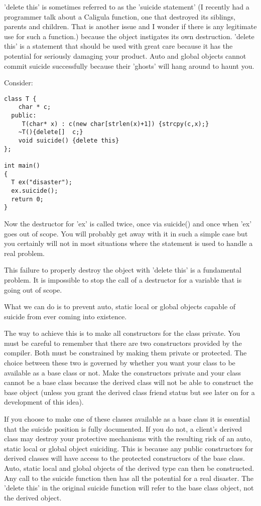 \documentclass{book}
\begin{document}
'delete this' is sometimes referred to as the 'suicide statement' (I recently had a programmer talk about a Caligula function, one that destroyed its siblings, parents and children.
That is another issue and I wonder if there is any legitimate use for such a function.) because the object instigates its own destruction. 
'delete this' is a statement that should be used with great care because it has the potential for seriously damaging your product. 
Auto and global objects cannot commit suicide successfully because their 'ghosts' will hang around to haunt you.

Consider:
\begin{lstlisting}
class T {
    char * c; 
  public:
     T(char* x) : c(new char[strlen(x)+1]) {strcpy(c,x);}
    ~T(){delete[]  c;}
    void suicide() {delete this}
};

int main()
{
  T ex("disaster"); 
  ex.suicide(); 
  return 0;
}
\end{lstlisting}

Now the destructor for 'ex' is called twice, once via suicide() and once when 'ex' goes out of scope.
You will probably get away with it in such a simple case but you certainly will not in most situations where the statement is used to handle a real problem.

This failure to properly destroy the object with 'delete this' is a fundamental problem. It is impossible to stop the call of a destructor for a variable that is going out of scope.

What we can do is to prevent auto, static local or global objects capable of suicide from ever coming into existence.

The way to achieve this is to make all constructors for the class private. You must be careful to remember that there are two constructors provided by the compiler.
Both must be constrained by making them private or protected. The choice between these two is governed by whether you want your class to be available as a base class or not.
Make the constructors private and your class cannot be a base class because the derived class will not be able to construct the base object (unless you grant 
the derived class friend status but see later on for a development of this idea).

If you choose to make one of these classes available as a base class it is essential that the suicide position is fully documented.
If you do not, a client's derived class may destroy your protective mechanisms with the resulting risk of an auto, static local or global object suiciding.
This is because any public constructors for derived classes will have access to the protected constructors of the base class.
Auto, static local and global objects of the derived type can then be constructed.
Any call to the suicide function then has all the potential for a real disaster.
The 'delete this' in the original suicide function will refer to the base class object, not the derived object.
\end{document}
